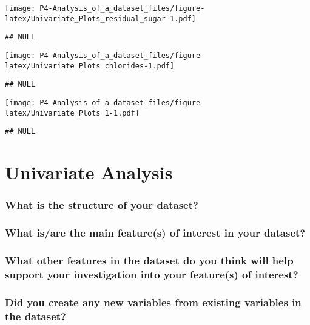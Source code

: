 \documentclass[]{article}
\begin{document}
\texttt{[image: P4-Analysis\_of\_a\_dataset\_files/figure-latex/Univariate\_Plots\_residual\_sugar-1.pdf]}

\begin{verbatim}
## NULL
\end{verbatim}

\texttt{[image: P4-Analysis\_of\_a\_dataset\_files/figure-latex/Univariate\_Plots\_chlorides-1.pdf]}

\begin{verbatim}
## NULL
\end{verbatim}

\texttt{[image: P4-Analysis\_of\_a\_dataset\_files/figure-latex/Univariate\_Plots\_1-1.pdf]}

\begin{verbatim}
## NULL
\end{verbatim}

\section{Univariate Analysis}\label{univariate-analysis}

\subsubsection{What is the structure of your
dataset?}\label{what-is-the-structure-of-your-dataset}

\subsubsection{What is/are the main feature(s) of interest in your
dataset?}\label{what-isare-the-main-features-of-interest-in-your-dataset}

\subsubsection{What other features in the dataset do you think will help
support your investigation into your feature(s) of
interest?}\label{what-other-features-in-the-dataset-do-you-think-will-help-support-your-investigation-into-your-features-of-interest}

\subsubsection{Did you create any new variables from existing variables
in the
dataset?}\label{did-you-create-any-new-variables-from-existing-variables-in-the-dataset}
\end{document}

